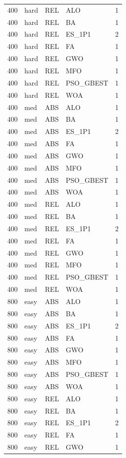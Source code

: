 \begin{tabular}{r l l l l}
400 & hard & REL & ALO & 1 \\
400 & hard & REL & BA & 1 \\
400 & hard & REL & ES_1P1 & 2 \\
400 & hard & REL & FA & 1 \\
400 & hard & REL & GWO & 1 \\
400 & hard & REL & MFO & 1 \\
400 & hard & REL & PSO_GBEST & 1 \\
400 & hard & REL & WOA & 1 \\
400 & med & ABS & ALO & 1 \\
400 & med & ABS & BA & 1 \\
400 & med & ABS & ES_1P1 & 2 \\
400 & med & ABS & FA & 1 \\
400 & med & ABS & GWO & 1 \\
400 & med & ABS & MFO & 1 \\
400 & med & ABS & PSO_GBEST & 1 \\
400 & med & ABS & WOA & 1 \\
400 & med & REL & ALO & 1 \\
400 & med & REL & BA & 1 \\
400 & med & REL & ES_1P1 & 2 \\
400 & med & REL & FA & 1 \\
400 & med & REL & GWO & 1 \\
400 & med & REL & MFO & 1 \\
400 & med & REL & PSO_GBEST & 1 \\
400 & med & REL & WOA & 1 \\
800 & easy & ABS & ALO & 1 \\
800 & easy & ABS & BA & 1 \\
800 & easy & ABS & ES_1P1 & 2 \\
800 & easy & ABS & FA & 1 \\
800 & easy & ABS & GWO & 1 \\
800 & easy & ABS & MFO & 1 \\
800 & easy & ABS & PSO_GBEST & 1 \\
800 & easy & ABS & WOA & 1 \\
800 & easy & REL & ALO & 1 \\
800 & easy & REL & BA & 1 \\
800 & easy & REL & ES_1P1 & 2 \\
800 & easy & REL & FA & 1 \\
800 & easy & REL & GWO & 1 \\

\end{tabular}
